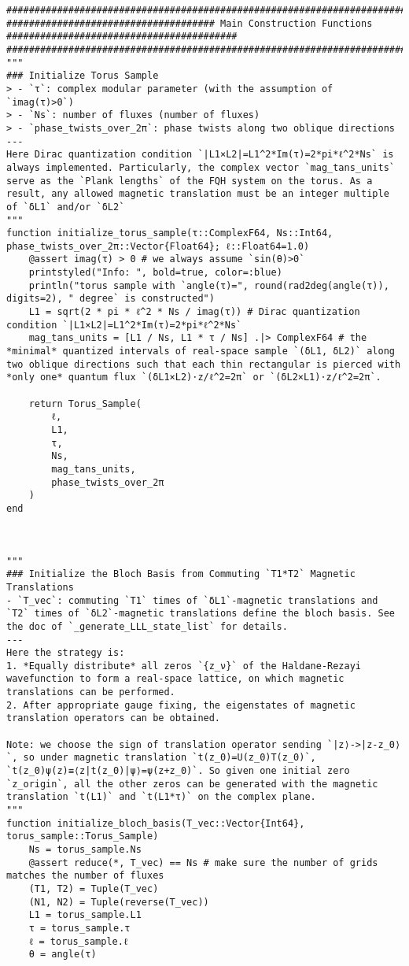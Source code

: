 \begin{verbatim}
###########################################################################################################
##################################### Main Construction Functions #########################################
###########################################################################################################
"""
### Initialize Torus Sample
> - `τ`: complex modular parameter (with the assumption of `imag(τ)>0`)
> - `Ns`: number of fluxes (number of fluxes)
> - `phase_twists_over_2π`: phase twists along two oblique directions
---
Here Dirac quantization condition `|L1×L2|=L1^2*Im(τ)=2*pi*ℓ^2*Ns` is always implemented. Particularly, the complex vector `mag_tans_units` serve as the `Plank lengths` of the FQH system on the torus. As a result, any allowed magnetic translation must be an integer multiple of `δL1` and/or `δL2`
"""
function initialize_torus_sample(τ::ComplexF64, Ns::Int64, phase_twists_over_2π::Vector{Float64}; ℓ::Float64=1.0)
    @assert imag(τ) > 0 # we always assume `sin(θ)>0`
    printstyled("Info: ", bold=true, color=:blue)
    println("torus sample with `angle(τ)=", round(rad2deg(angle(τ)), digits=2), " degree` is constructed")
    L1 = sqrt(2 * pi * ℓ^2 * Ns / imag(τ)) # Dirac quantization condition `|L1×L2|=L1^2*Im(τ)=2*pi*ℓ^2*Ns`
    mag_tans_units = [L1 / Ns, L1 * τ / Ns] .|> ComplexF64 # the *minimal* quantized intervals of real-space sample `(δL1, δL2)` along two oblique directions such that each thin rectangular is pierced with *only one* quantum flux `(δL1×L2)⋅z/ℓ^2=2π` or `(δL2×L1)⋅z/ℓ^2=2π`. 

    return Torus_Sample(
        ℓ,
        L1,
        τ,
        Ns,
        mag_tans_units,
        phase_twists_over_2π
    )
end



"""
### Initialize the Bloch Basis from Commuting `T1*T2` Magnetic Translations
- `T_vec`: commuting `T1` times of `δL1`-magnetic translations and `T2` times of `δL2`-magnetic translations define the bloch basis. See the doc of `_generate_LLL_state_list` for details.
---
Here the strategy is: 
1. *Equally distribute* all zeros `{z_ν}` of the Haldane-Rezayi wavefunction to form a real-space lattice, on which magnetic translations can be performed.
2. After appropriate gauge fixing, the eigenstates of magnetic translation operators can be obtained.

Note: we choose the sign of translation operator sending `|z⟩->|z-z_0⟩`, so under magnetic translation `t(z_0)=U(z_0)T(z_0)`, `t(z_0)ψ(z)≡⟨z|t(z_0)|ψ⟩=ψ(z+z_0)`. So given one initial zero `z_origin`, all the other zeros can be generated with the magnetic translation `t(L1)` and `t(L1*τ)` on the complex plane.
"""
function initialize_bloch_basis(T_vec::Vector{Int64}, torus_sample::Torus_Sample)
    Ns = torus_sample.Ns
    @assert reduce(*, T_vec) == Ns # make sure the number of grids matches the number of fluxes
    (T1, T2) = Tuple(T_vec)
    (N1, N2) = Tuple(reverse(T_vec))
    L1 = torus_sample.L1
    τ = torus_sample.τ
    ℓ = torus_sample.ℓ
    θ = angle(τ)


\end{verbatim}

